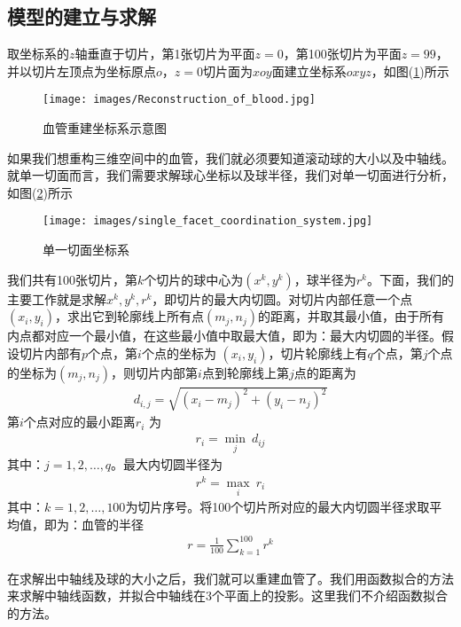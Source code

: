     \subsection{模型的建立与求解}
        \par
        取坐标系的$z$轴垂直于切片，第1张切片为平面$z=0$，第100张切片为平面$z=99$，并以切片左顶点为坐标原点$o$，$z=0$切片面为$xoy$面建立坐标系$oxyz$，如图(\ref{血管重建坐标系示意图})所示
            \begin{figure}[H]
            \centering
            \texttt{[image: images/Reconstruction\_of\_blood.jpg]}
            \caption{血管重建坐标系示意图}
            \label{血管重建坐标系示意图}
            \end{figure}
        \par
        如果我们想重构三维空间中的血管，我们就必须要知道滚动球的大小以及中轴线。就单一切面而言，我们需要求解球心坐标以及球半径，我们对单一切面进行分析，如图(\ref{单一切面坐标系})所示
            \begin{figure}[H]
            \centering
            \texttt{[image: images/single\_facet\_coordination\_system.jpg]}
            \caption{单一切面坐标系}
            \label{单一切面坐标系}
            \end{figure}
        \par
        我们共有100张切片，第$k$个切片的球中心为$(x^k,y^k)$，球半径为$r^k$。下面，我们的主要工作就是求解$x^k,y^k,r^k$，即切片的最大内切圆。对切片内部任意一个点$(x_i,y_i)$，求出它到轮廓线上所有点$(m_j,n_j)$的距离，并取其最小值，由于所有内点都对应一个最小值，在这些最小值中取最大值，即为：最大内切圆的半径。假设切片内部有$p$个点，第$i$个点的坐标为 $(x_i,y_i)$，切片轮廓线上有$q$个点，第$j$个点的坐标为$(m_j,n_j)$，则切片内部第$i$点到轮廓线上第$j$点的距离为
        \begin{align*}
        d_{i,j} = \sqrt{(x_i-m_j)^2+(y_i-n_j)^2}
        \end{align*}
        第$i$个点对应的最小距离$r_i$ 为
        \begin{align*}
        r_i = \min_j\ d_{ij}
        \end{align*}
        其中：$j = 1,2,\dots,q$。最大内切圆半径为
        \begin{align*}
        r^k = \max_{i}\ r_i
        \end{align*}
        其中：$k = 1,2,\dots,100$为切片序号。将100个切片所对应的最大内切圆半径求取平均值，即为：血管的半径
        \begin{align*}
        r = \frac{1}{100}\sum_{k=1}^{100} r^k
        \end{align*}
        \par
        在求解出中轴线及球的大小之后，我们就可以重建血管了。我们用函数拟合的方法来求解中轴线函数，并拟合中轴线在3个平面上的投影。这里我们不介绍函数拟合的方法。

